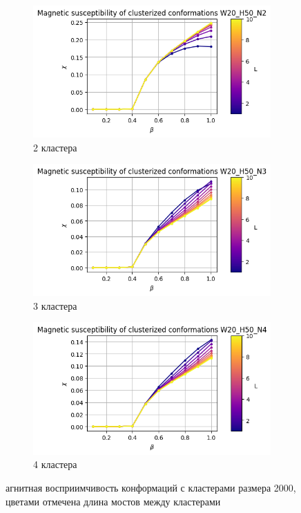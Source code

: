 \documentclass[14pt]{extarticle}
\begin{document}
\begin{figure}[ht]
	\centering
    \begin{subfigure}[t]{0.3\textwidth}
        \includegraphics*[width=\textwidth]{../images/magnetic_susceptibility/clusterized_W20_H50_N2.png}
        \caption*{2 кластера}
    \end{subfigure}
    \begin{subfigure}[t]{0.3\textwidth}
        \includegraphics*[width=\textwidth]{../images/magnetic_susceptibility/clusterized_W20_H50_N3.png}
        \caption*{3 кластера}

    \end{subfigure}
    \begin{subfigure}[t]{0.3\textwidth}
        \includegraphics*[width=\textwidth]{../images/magnetic_susceptibility/clusterized_W20_H50_N4.png}
        \caption*{4 кластера}
    \end{subfigure}
	\caption{агнитная восприимчивость конформаций с кластерами размера 2000, цветами отмечена длина мостов между кластерами}
	\label{fig:cluster_magnetc_sus}
\end{figure}
\end{document}
